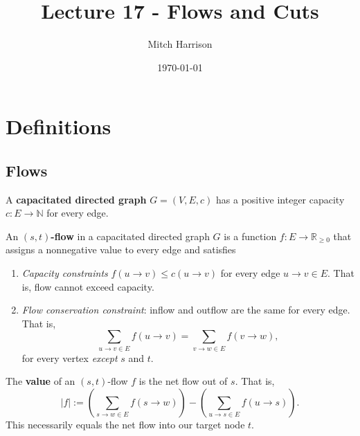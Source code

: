 \documentclass[titlepage, 12pt, leqno]{article}
\title{\Huge{Lecture 17 - Flows and Cuts}}
\author{\large{Mitch Harrison}}
\date{\today}
\begin{document}
\setlength{\parskip}{1\baselineskip}
\setlength{\parindent}{15pt}
\maketitle
\tableofcontents
\newpage


\section{Definitions}

\subsection{Flows}

\begin{definition}
    A \textbf{capacitated directed graph} $G = (V,E,c)$ has a positive integer
    capacity $c:E \rightarrow \mathbb{N}$ for every edge.
\end{definition}

\begin{definition}
    An \textbf{$(s,t)$-flow} in a capacitated directed graph $G$ is a function
    $f:E \rightarrow \mathbb{R}_{\ge 0}$ that assigns a nonnegative value to
    every edge and satisfies
    \begin{enumerate}
        \item \textit{Capacity constraints} $f(u\rightarrow v) \le
            c(u \rightarrow v)$ for every edge $u \rightarrow v \in E$. That is,
            flow cannot exceed capacity.
        \item \textit{Flow conservation constraint}: inflow and outflow are the
            same for every edge. That is,
            \[
                \sum_{u\rightarrow v \in E}f(u\rightarrow v) =
                \sum_{v \rightarrow w \in E}f(v\rightarrow w),
            \]
            for every vertex \textit{except} $s$ and $t$.
    \end{enumerate}
\end{definition}

\begin{definition}
    The \textbf{value} of an $(s,t)$-flow $f$ is the net flow out of $s$. That
    is,
    \[
    |f| := \left(\sum_{s \rightarrow w \in E}f(s \rightarrow w)\right) -
    \left(\sum_{u \rightarrow s \in E}f(u \rightarrow s)\right).
    \]
    This necessarily equals the net flow into our target node $t$.
\end{definition}
\end{document}
